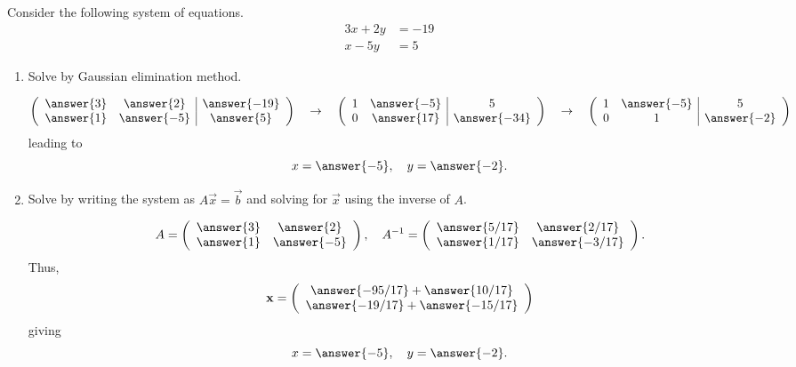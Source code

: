 \documentclass{ximera}
\author{Parisa Fatheddin}
\begin{document}
\begin{exercise}
Consider the following system of equations.
\begin{align*}
3x+ 2y&= -19\\
x-5y &= 5
\end{align*}

\begin{enumerate}
\item Solve by Gaussian elimination method.
  \begin{prompt}
    \[
      \left(
        \begin{array}{cc|c}
          \answer{3} & \answer{2} & \answer{-19}\\
          \answer{1} & \answer{-5} & \answer{5}
        \end{array}
      \right)
      \quad \rightarrow \quad
      \left(
        \begin{array}{cc|c}
          1 & \answer{-5} & 5\\
          0 & \answer{17} & \answer{-34}
        \end{array}
      \right)
      \quad \rightarrow \quad
      \left(
        \begin{array}{cc|c}
          1 & \answer{-5} & 5\\
          0 & 1 & \answer{-2}
        \end{array}
      \right)
    \]
    leading to
    \begin{equation*}
      x= \answer{-5}, \quad y = \answer{-2}.
    \end{equation*}
  \end{prompt}
\item Solve by writing the system as $A\vec{x}=\vec{b}$ and solving
  for $\vec{x}$ using the inverse of $A$.
  \begin{prompt}
    \[
      A= \left(
        \begin{array}{cc}
          \answer{3} & \answer{2}\\
          \answer{1} & \answer{-5}
        \end{array}
      \right), \quad
      A^{-1}= \left(
        \begin{array}{cc}
          \answer{5/17} & \answer{2/17}\\
          \answer{1/17} & \answer{-3/17}
        \end{array}
      \right).
    \]
    Thus,
    \[
      \vec{x} = \left(
        \begin{array}{c}
          \answer{-95/17} + \answer{10/17}\\
          \answer{-19/17} + \answer{-15/17}
        \end{array}
      \right)
    \]
    giving
    \begin{equation*}
      x= \answer{-5}, \quad y = \answer{-2}.
    \end{equation*}
  \end{prompt}
\end{enumerate}

\end{exercise}
\end{document}
